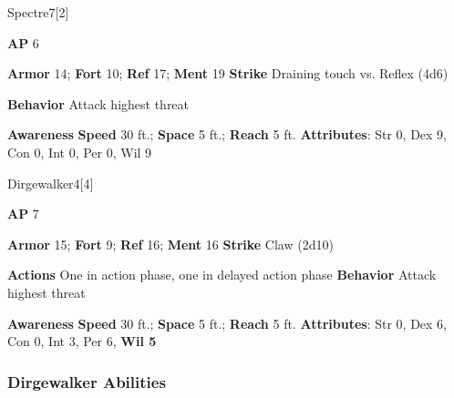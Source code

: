 \begin{monsection}{Spectre}{7}[2]
\vspace{-1em}\vspace{-1em}
\begin{spellcontent}
\begin{spelltargetinginfo}
{\textbf{AP} 6}

\pari \textbf{Armor} 14;
\textbf{Fort} 10;
\textbf{Ref} 17;
\textbf{Ment} 19
\pari \textbf{Strike} Draining touch  vs. Reflex (4d6)



\pari \textbf{Behavior} Attack highest threat
\end{spelltargetinginfo}
\end{spellcontent}

\begin{monsterfooter}
\pari \textbf{Awareness} 
\pari \textbf{Speed} 30 ft.;
\textbf{Space} 5 ft.;
\textbf{Reach} 5 ft.
\pari \textbf{Attributes}:
Str 0,
Dex 9,
Con 0,
Int 0,
Per 0,
Wil 9
\end{monsterfooter}
\end{monsection}

\begin{monsection}{Dirgewalker}{4}[4]
\vspace{-1em}\vspace{-1em}
\begin{spellcontent}
\begin{spelltargetinginfo}
{\textbf{AP} 7}

\pari \textbf{Armor} 15;
\textbf{Fort} 9;
\textbf{Ref} 16;
\textbf{Ment} 16
\pari \textbf{Strike} Claw  (2d10)


\pari \textbf{Actions} One in action phase, one in delayed action phase
\pari \textbf{Behavior} Attack highest threat
\end{spelltargetinginfo}
\end{spellcontent}

\begin{monsterfooter}
\pari \textbf{Awareness} 
\pari \textbf{Speed} 30 ft.;
\textbf{Space} 5 ft.;
\textbf{Reach} 5 ft.
\pari \textbf{Attributes}:
Str 0,
Dex 6,
Con 0,
Int 3,
Per 6,
\textbf{Wil 5}
\end{monsterfooter}
\end{monsection}


\subsubsection{Dirgewalker Abilities}

